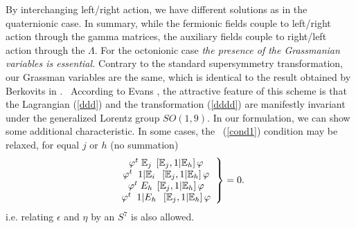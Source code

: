 \documentclass[a4paper,12pt]{book}
\begin{document}
By interchanging left/right action, we have different solutions as in the
quaternionic case. In summary, while the fermionic fields couple to
left/right action through the gamma matrices, the auxiliary fields couple to
right/left action through the $\Lambda $. For the octonionic case \emph{the
presence of the Grassmanian variables is essential.} Contrary to the
standard supersymmetry transformation, our Grassman variables are the same,
which is identical to the result obtained by Berkovits in \cite{r7}. \
According to Evans \cite{r8}, the attractive feature of this scheme is that
the Lagrangian (\ref{ddd}) and the transformation (\ref{dddd}) are
manifestly invariant under the generalized Lorentz group $SO\left(
1,9\right) $. In our formulation, we can show some additional
characteristic. In some cases, the \ (\ref{cond1}) condition may be relaxed,
for equal $j$ or $h$ (no summation) 
\begin{equation}
\left. 
\begin{array}{c}
\varphi ^{t}\;\Bbb{E}_{j}\;\left[ \Bbb{E}_{j},1|\Bbb{E}_{h}\right] \varphi
\\ 
\varphi ^{t}\;\;1|\Bbb{E}_{i}\;\;\left[ \Bbb{E}_{j},1|\Bbb{E}_{h}\right]
\varphi \\ 
\varphi ^{t}\;E_{h}\;\left[ \Bbb{E}_{j},1|\Bbb{E}_{h}\right] \varphi \\ 
\varphi ^{t}\;\;1|E_{h}\;\;\left[ \Bbb{E}_{j},1|\Bbb{E}_{h}\right] \varphi
\end{array}
\right\} =0.
\end{equation}
i.e. relating $\epsilon $ and $\eta $ by an $S^{7}$ is also allowed.
\end{document}
